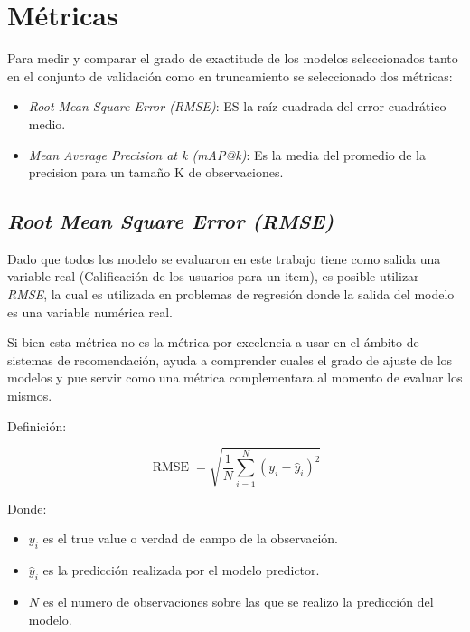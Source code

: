 \documentclass[11pt,a4paper,twoside]{thesis}
\begin{document}
{\section{Métricas}

Para medir y comparar el grado de exactitude de los modelos seleccionados tanto en el conjunto de validación como en truncamiento se seleccionado dos métricas:

\begin{itemize}
	\item \textit{Root Mean Square Error (RMSE)}: ES la raíz cuadrada del error cuadrático medio.
	\item \textit{Mean Average Precision at k (mAP@k)}: Es la media del promedio de la precision  para un tamaño K de observaciones.
\end{itemize}

\subsection{\textit{Root Mean Square Error (RMSE)}}

Dado que todos los modelo se evaluaron en este trabajo tiene como salida una variable real (Calificación de los usuarios para un item), es posible utilizar \textit{RMSE}, la cual es  
utilizada en problemas de regresión donde la salida del modelo es una variable numérica real.

Si bien esta métrica no es la métrica por excelencia a usar en el ámbito de sistemas de recomendación, ayuda a comprender cuales el grado de ajuste de los modelos y pue servir como una métrica complementara al momento de evaluar los mismos.

\begin{description}
	\item[Definición:]
\end{description}
\begin{equation}
	\operatorname{RMSE}=\sqrt{  \frac{1}{N} \sum_{i=1}^N (y_i - \hat y_i)^2}
\end{equation}
\begin{description}
	\item[Donde:]
\end{description}
\begin{itemize}
	\item $y_i$ es el true value o verdad de campo de la observación.
	\item $\hat y_i$ es la predicción realizada por el modelo predictor.
	\item $N$ es el numero de observaciones sobre las que se realizo la predicción del modelo.
\end{itemize}

}
\end{document}
